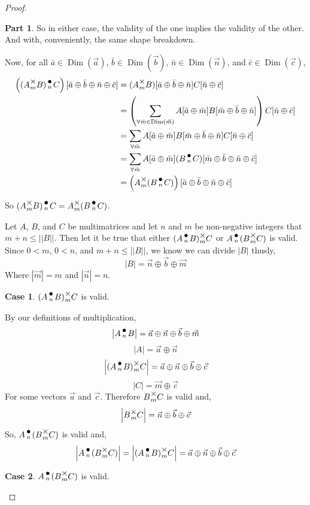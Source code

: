 \documentclass[12pt]{book}
\theoremstyle{plain}
\theoremstyle{definition}
\theoremstyle{ppart}
\newtheorem{ppart}{Part}
\theoremstyle{case}
\newtheorem{case}{Case}
\theoremstyle{solution}
\DeclareMathOperator{\Dim}{Dim}
\newcommand{\mmult}[1]{\text{\raisebox{1ex}{$\underset{#1}{\times}$}}}
\newcommand{\dmult}[1]{\text{\raisebox{1ex}{$\underset{#1}{\,\bullet\,}$}}}
\newcommand{\shape}[1]{\left|#1\right|}
\begin{document}
\begin{proof}
\begin{ppart}
So in either case, the validity of the one implies the validity of the other. And with, conveniently, the same shape breakdown.

Now, for all $\bar{a} \in \Dim(\vec{a})$, $\bar{b} \in \Dim(\vec{b})$, $\bar{n} \in \Dim(\vec{n})$, and $\bar{c} \in \Dim(\vec{c})$,
\begin{align*}
  \left((A \mmult{m} B) \dmult{n} C\right)[\bar{a} \oplus \bar{b} \oplus \bar{n} \oplus \bar{c}]
  &= (A \mmult{m} B)[\bar{a} \oplus \bar{b} \oplus \bar{n}] C[\bar{n} \oplus \bar{c}] \\
  &= \left(\sum_{\forall \bar{m} \in \Dim(\vec{m})} A[\bar{a} \oplus \bar{m}] B[\bar{m} \oplus \bar{b} \oplus \bar{n}]\right) C[\bar{n} \oplus \bar{c}] \\
  &= \sum_{\forall \bar{m}} A[\bar{a} \oplus \bar{m}] B[\bar{m} \oplus \bar{b} \oplus \bar{n}] C[\bar{n} \oplus \bar{c}] \\
  &= \sum_{\forall \bar{m}} A[\bar{a} \oplus \bar{m}] (B \dmult{n} C)[\bar{m} \oplus \bar{b} \oplus \bar{n} \oplus \bar{c}] \\
  &= \left(A \mmult{m} (B \dmult{n} C)\right)[\bar{a} \oplus \bar{b} \oplus \bar{n} \oplus \bar{c}]
\end{align*}

So $(A \mmult{m} B) \dmult{n} C = A \mmult{m} (B \dmult{n} C)$.
\end{ppart}
\setcounter{case}{0}
Let $A$, $B$, and $C$ be multimatrices and let $n$ and $m$ be non-negative integers that $m+n \le \shape{\shape{B}}$.
Then let it be true that either $(A \dmult{n} B) \mmult{m} C$ or $A \dmult{n} (B \mmult{m} C)$ is valid.
Since $0 < m$, $0 < n$, and $m + n \le \shape{\shape{B}}$, we know we can divide $\shape{B}$ thusly,
\[ \shape{B} = \vec{n} \oplus \vec{b} \oplus \vec{m} \]
Where $\shape{\vec{m}} = m$ and $\shape{\vec{n}} = n$.

\begin{case} $(A \dmult{n} B) \mmult{m} C$ is valid.

By our definitions of multiplication,
\[ \shape{A \dmult{n} B} = \vec{a} \oplus \vec{n} \oplus \vec{b} \oplus \vec{m} \]
\[ \shape{A} = \vec{a} \oplus \vec{n} \]
\[ \shape{(A \dmult{n} B) \mmult{m} C} = \vec{a} \oplus \vec{n} \oplus \vec{b} \oplus \vec{c} \]
\[ \shape{C} = \vec{m} \oplus \vec{c} \]
For some vectors $\vec{a}$ and $\vec{c}$. 
Therefore $B \mmult{m} C$ is valid and,
\[ \shape{B \mmult{m} C} = \vec{n} \oplus \vec{b} \oplus \vec{c} \]
So, $A \dmult{n} (B \mmult{m} C)$ is valid and,
\[ \shape{A \dmult{n} (B \mmult{m} C)} = \shape{(A \dmult{n} B) \mmult{m} C} = \vec{a} \oplus \vec{n} \oplus \vec{b} \oplus \vec{c} \]
\end{case}
\begin{case} $A \dmult{n} (B \mmult{m} C)$ is valid.


\end{case}
\end{proof}
\end{document}
